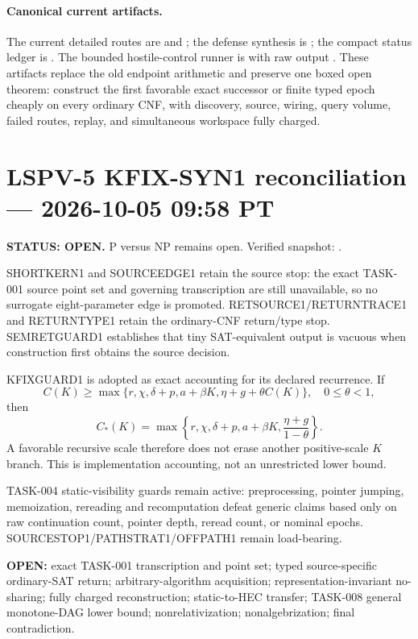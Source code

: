 \documentclass[11pt]{article}
\begin{document}
\paragraph{Canonical current artifacts.}
The current detailed routes are  and ; the
defense synthesis is ; the compact status ledger is
.  The bounded hostile-control runner is
 with raw output
.  These artifacts replace the old
endpoint arithmetic and preserve one boxed open theorem: construct the first
favorable exact successor or finite typed epoch cheaply on every ordinary CNF,
with discovery, source, wiring, query volume, failed routes, replay, and
simultaneous workspace fully charged.

\clearpage

\section{LSPV-5 KFIX-SYN1 reconciliation --- 2026-10-05 09:58 PT}
\textbf{STATUS: OPEN.} P versus NP remains open. Verified snapshot:
.

SHORTKERN1 and SOURCEEDGE1 retain the source stop: the exact TASK-001 source point set and governing transcription are still unavailable, so no surrogate eight-parameter edge is promoted. RETSOURCE1/RETURNTRACE1 and RETURNTYPE1 retain the ordinary-CNF return/type stop. SEMRETGUARD1 establishes that tiny SAT-equivalent output is vacuous when construction first obtains the source decision.

KFIXGUARD1 is adopted as exact accounting for its declared recurrence. If
\[
C(K)\ge\max\{r,\chi,\delta+p,a+\beta K,\eta+g+\theta C(K)\},\quad 0\le\theta<1,
\]
then
\[
C_*(K)=\max\left\{r,\chi,\delta+p,a+\beta K,\frac{\eta+g}{1-\theta}\right\}.
\]
A favorable recursive scale therefore does not erase another positive-scale \(K\) branch. This is implementation accounting, not an unrestricted lower bound.

TASK-004 static-visibility guards remain active: preprocessing, pointer jumping, memoization, rereading and recomputation defeat generic claims based only on raw continuation count, pointer depth, reread count, or nominal epochs. SOURCESTOP1/PATHSTRAT1/OFFPATH1 remain load-bearing.

\textbf{OPEN:} exact TASK-001 transcription and point set; typed source-specific ordinary-SAT return; arbitrary-algorithm acquisition; representation-invariant no-sharing; fully charged reconstruction; static-to-HEC transfer; TASK-008 general monotone-DAG lower bound; nonrelativization; nonalgebrization; final contradiction.
\end{document}
